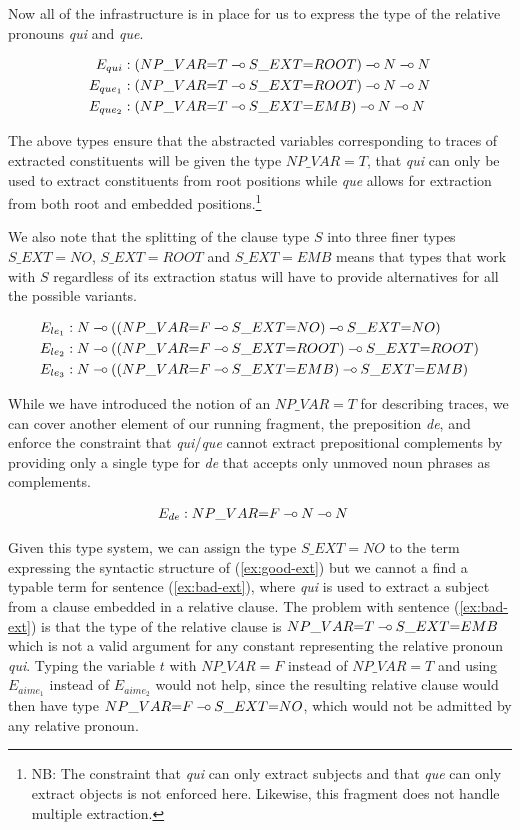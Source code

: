 Now all of the infrastructure is in place for us to express the type of
the relative pronouns \emph{qui} and \emph{que}.

\begin{align*}
E_{qui} &: (NP\_VAR{=}T \mathbin{{-}\mkern-3.5mu{\circ}} S\_EXT{=}ROOT) \mathbin{{-}\mkern-3.5mu{\circ}} N \mathbin{{-}\mkern-3.5mu{\circ}} N \\
E_{que_1} &: (NP\_VAR{=}T \mathbin{{-}\mkern-3.5mu{\circ}} S\_EXT{=}ROOT) \mathbin{{-}\mkern-3.5mu{\circ}} N \mathbin{{-}\mkern-3.5mu{\circ}} N \\
E_{que_2} &: (NP\_VAR{=}T \mathbin{{-}\mkern-3.5mu{\circ}} S\_EXT{=}EMB) \mathbin{{-}\mkern-3.5mu{\circ}} N \mathbin{{-}\mkern-3.5mu{\circ}} N
\end{align*}

The above types ensure that the abstracted variables corresponding to
traces of extracted constituents will be given the type $NP\_VAR{=}T$,
that \emph{qui} can only be used to extract constituents from root
positions while \emph{que} allows for extraction from both root and
embedded positions.\footnote{NB: The constraint that \emph{qui} can only
  extract subjects and that \emph{que} can only extract objects is not
  enforced here. Likewise, this fragment does not handle multiple
  extraction.}

We also note that the splitting of the clause type $S$ into three finer
types $S\_EXT={NO}$, $S\_EXT{=}ROOT$ and $S\_EXT{=}EMB$ means that types
that work with $S$ regardless of its extraction status will have to
provide alternatives for all the possible variants.

\begin{align*}
E_{le_1} &: N \mathbin{{-}\mkern-3.5mu{\circ}} ((NP\_VAR{=}F \mathbin{{-}\mkern-3.5mu{\circ}} S\_EXT{=}NO) \mathbin{{-}\mkern-3.5mu{\circ}} S\_EXT{=}NO) \\
E_{le_2} &: N \mathbin{{-}\mkern-3.5mu{\circ}} ((NP\_VAR{=}F \mathbin{{-}\mkern-3.5mu{\circ}} S\_EXT{=}ROOT) \mathbin{{-}\mkern-3.5mu{\circ}} S\_EXT{=}ROOT) \\
E_{le_3} &: N \mathbin{{-}\mkern-3.5mu{\circ}} ((NP\_VAR{=}F \mathbin{{-}\mkern-3.5mu{\circ}} S\_EXT{=}EMB) \mathbin{{-}\mkern-3.5mu{\circ}} S\_EXT{=}EMB)
\end{align*}

While we have introduced the notion of an $NP\_VAR{=}T$ for describing
traces, we can cover another element of our running fragment, the
preposition \emph{de}, and enforce the constraint that
\emph{qui}/\emph{que} cannot extract prepositional complements by
providing only a single type for \emph{de} that accepts only unmoved
noun phrases as complements.

\begin{align*}
E_{de} &: NP\_VAR{=}F \mathbin{{-}\mkern-3.5mu{\circ}} N \mathbin{{-}\mkern-3.5mu{\circ}} N
\end{align*}

Given this type system, we can assign the type $S\_EXT{=}NO$ to the term
expressing the syntactic structure of (\ref{ex:good-ext}) but we cannot
a find a typable term for sentence (\ref{ex:bad-ext}), where \emph{qui}
is used to extract a subject from a clause embedded in a relative
clause.  The problem with sentence (\ref{ex:bad-ext}) is that the type
of the relative clause is $NP\_VAR{=}T \mathbin{{-}\mkern-3.5mu{\circ}} S\_EXT{=}EMB$ which is not
a valid argument for any constant representing the relative pronoun
\emph{qui}. Typing the variable $t$ with $NP\_VAR{=}F$ instead of
$NP\_VAR{=}T$ and using $E_{aime_1}$ instead of $E_{aime_2}$ would not
help, since the resulting relative clause would then have type
$NP\_VAR{=}F \mathbin{{-}\mkern-3.5mu{\circ}} S\_EXT{=}NO$, which would not be admitted by any
relative pronoun.

